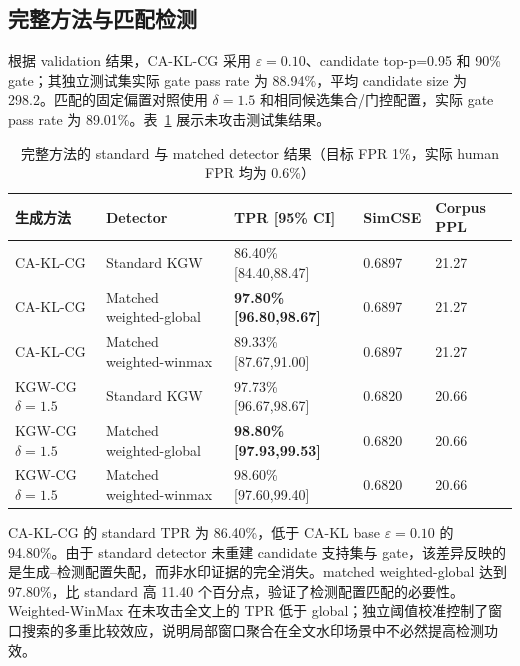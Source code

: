 \documentclass[a4paper,UTF8,zihao=5]{ctexart}
\newcommand{\cakl}{CA-KL}
\newcommand{\caklcg}{CA-KL-CG}
\begin{document}
\subsection{完整方法与匹配检测}

根据 validation 结果，\caklcg{} 采用 $\varepsilon=0.10$、candidate top-p=0.95 和 90\% gate；其独立测试集实际 gate pass rate 为 88.94\%，平均 candidate size 为 298.2。匹配的固定偏置对照使用 $\delta=1.5$ 和相同候选集合/门控配置，实际 gate pass rate 为 89.01\%。表~\ref{tab:matched} 展示未攻击测试集结果。

\begin{table}[H]
    \centering
    \caption{完整方法的 standard 与 matched detector 结果（目标 FPR 1\%，实际 human FPR 均为 0.6\%）}
    \label{tab:matched}
    \scriptsize
    \begin{tabularx}{\textwidth}{p{}p{}p{}p{}p{}}
        \toprule
        生成方法                & Detector                & TPR [95\% CI]                  & SimCSE & Corpus PPL \\
        \midrule
        \caklcg{}           & Standard KGW            & 86.40\% [84.40,88.47]          & 0.6897 & 21.27      \\
        \caklcg{}           & Matched weighted-global & \textbf{97.80\% [96.80,98.67]} & 0.6897 & 21.27      \\
        \caklcg{}           & Matched weighted-winmax & 89.33\% [87.67,91.00]          & 0.6897 & 21.27      \\
        \midrule
        KGW-CG $\delta=1.5$ & Standard KGW            & 97.73\% [96.67,98.67]          & 0.6820 & 20.66      \\
        KGW-CG $\delta=1.5$ & Matched weighted-global & \textbf{98.80\% [97.93,99.53]} & 0.6820 & 20.66      \\
        KGW-CG $\delta=1.5$ & Matched weighted-winmax & 98.60\% [97.60,99.40]          & 0.6820 & 20.66      \\
        \bottomrule
    \end{tabularx}
\end{table}

\caklcg{} 的 standard TPR 为 86.40\%，低于 \cakl{} base $\varepsilon=0.10$ 的 94.80\%。由于 standard detector 未重建 candidate 支持集与 gate，该差异反映的是生成--检测配置失配，而非水印证据的完全消失。matched weighted-global 达到 97.80\%，比 standard 高 11.40 个百分点，验证了检测配置匹配的必要性。Weighted-WinMax 在未攻击全文上的 TPR 低于 global；独立阈值校准控制了窗口搜索的多重比较效应，说明局部窗口聚合在全文水印场景中不必然提高检测功效。
\end{document}
